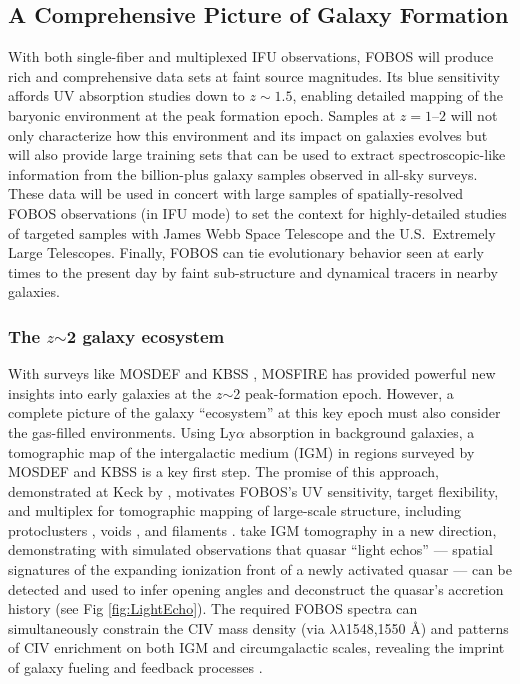 
\subsection{A Comprehensive Picture of Galaxy Formation}

With both single-fiber and multiplexed IFU observations, FOBOS will produce rich and comprehensive data sets at faint source magnitudes.  Its blue sensitivity affords UV absorption studies down to $z \sim 1.5$, enabling detailed mapping of the baryonic environment at the peak formation epoch.  Samples at $z=1$--$2$ will not only characterize how this environment and its impact on galaxies evolves but will also provide large training sets that can be used to extract spectroscopic-like information from the billion-plus galaxy samples observed in all-sky surveys.  These data will be used in concert with large samples of spatially-resolved FOBOS observations (in IFU mode) to set the context for highly-detailed studies of targeted samples with James Webb Space Telescope and the U.S.~Extremely Large Telescopes.  Finally, FOBOS can tie evolutionary behavior seen at early times to the present day by faint sub-structure and dynamical tracers in nearby galaxies.

\subsubsection{The $z$$\sim$2 galaxy ecosystem}
\label{sec:z2galaxies}

With surveys like MOSDEF \citep{kriek15} and KBSS
\citep{steidel14}, MOSFIRE has provided powerful new
insights into early galaxies at the $z$$\sim$2 peak-formation epoch.
However, a complete picture of the galaxy ``ecosystem'' at this key
epoch must also consider the gas-filled environments. Using
Ly$\alpha$ absorption in background galaxies, a tomographic map of
the intergalactic medium (IGM) in regions surveyed by MOSDEF and KBSS
is a key first step. The promise of this approach, demonstrated at
Keck by \citet{lee14}, motivates FOBOS's UV sensitivity, target
flexibility, and multiplex for tomographic mapping of large-scale
structure, including protoclusters \citep{lee16}, voids
\citep{krolewski18}, and filaments \citep{horowitz19}.
\citet{2018arXiv181005156S} take IGM tomography in a new direction,
demonstrating with simulated observations that quasar ``light echos''
--- spatial signatures of the expanding ionization front of a newly
activated quasar --- can be detected and used to infer opening angles
and deconstruct the quasar's accretion history (see Fig
\ref{fig:LightEcho}). The required FOBOS spectra can simultaneously
constrain the CIV mass density (via $\lambda\lambda$1548,1550 \AA)
and patterns of CIV enrichment on both IGM and circumgalactic scales,
revealing the imprint of galaxy fueling and feedback processes
\citep[e.g.,][]{tumlinson17}.

